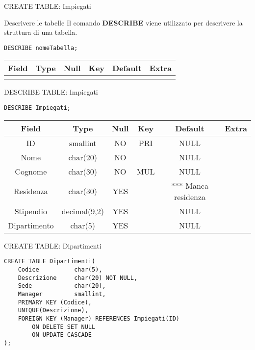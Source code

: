 %
\begin{frame}{CREATE TABLE: Impiegati}
\vspace*{0.9cm}

\end{frame}
%
\begin{frame}[fragile]{Descrivere le tabelle}
Il comando \textbf{DESCRIBE} viene utilizzato per descrivere la struttura di una tabella.
\begin{lstlisting}
DESCRIBE nomeTabella;
\end{lstlisting}
\begin{tabular}{|c|c|c|c|c|c|}
    \hline
    \rowcolor{cyan!30} Field & Type & Null & Key & Default & Extra \\ \hline
    & & & & & \\ \hline
\end{tabular}
\end{frame}
%
\begin{frame}[fragile]{DESCRIBE TABLE: Impiegati}
\begin{lstlisting}
DESCRIBE Impiegati;
\end{lstlisting}
\begin{tabular}{|c|c|c|c|c|c|}
    \hline
    \rowcolor{cyan!30} Field & Type & Null & Key & Default & Extra \\
    \hline
    ID & smallint & NO & PRI & NULL & \\ \hline
    Nome & char(20) & NO & & NULL & \\ \hline
    Cognome & char(30) & NO & MUL & NULL & \\ \hline
    Residenza & char(30) & YES & & *** Manca residenza & \\ \hline
    Stipendio & decimal(9,2) & YES & & NULL & \\ \hline
    Dipartimento & char(5) & YES & & NULL & \\ \hline
\end{tabular}
\end{frame}
%
\begin{frame}[fragile]{CREATE TABLE: Dipartimenti}
\begin{lstlisting}
CREATE TABLE Dipartimenti(
    Codice          char(5),
    Descrizione     char(20) NOT NULL,
    Sede            char(20),
    Manager         smallint,
    PRIMARY KEY (Codice),
    UNIQUE(Descrizione),
    FOREIGN KEY (Manager) REFERENCES Impiegati(ID)
        ON DELETE SET NULL
        ON UPDATE CASCADE
);    
\end{lstlisting}
\end{frame}
